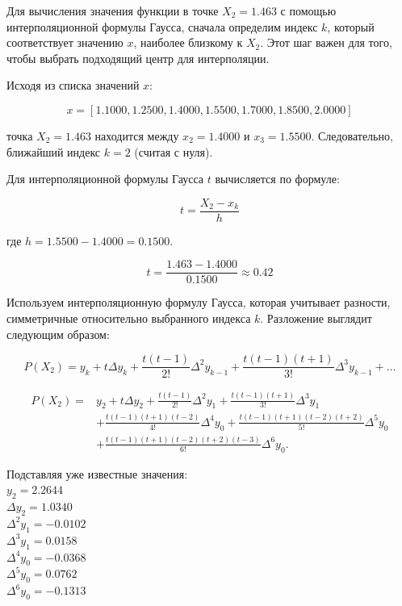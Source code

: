 \documentclass{article}
\begin{document}
                  Для вычисления значения функции в точке \( X_2 = 1.463 \) с помощью интерполяционной формулы Гаусса, сначала определим индекс \( k \), который соответствует значению \( x \), наиболее близкому к \( X_2 \). Этот шаг важен для того, чтобы выбрать подходящий центр для интерполяции.

                  Исходя из списка значений \( x \):

                  \[
                  x = [1.1000, 1.2500, 1.4000, 1.5500, 1.7000, 1.8500, 2.0000]
                  \]

                  точка \( X_2 = 1.463 \) находится между \( x_2 = 1.4000 \) и \( x_3 = 1.5500 \). Следовательно, ближайший индекс \( k = 2 \) (считая с нуля).

                  Для интерполяционной формулы Гаусса \( t \) вычисляется по формуле:

                  \[
                  t = \frac{X_2 - x_k}{h}
                  \]

                  где \( h = 1.5500 - 1.4000 = 0.1500 \).

                  \[
                  t = \frac{1.463 - 1.4000}{0.1500} \approx 0.42
                  \]

                  Используем интерполяционную формулу Гаусса, которая учитывает разности, симметричные относительно выбранного индекса \( k \). Разложение выглядит следующим образом:

                  \[
                  P(X_2) = y_k + t \Delta y_k + \frac{t(t-1)}{2!} \Delta^2 y_{k-1} + \frac{t(t-1)(t+1)}{3!} \Delta^3 y_{k-1} + \ldots
                  \]


                  \[
                  \begin{aligned}
                  P(X_2) = & y_2 + t \Delta y_2 + \frac{t(t-1)}{2!} \Delta^2 y_1 + \frac{t(t-1)(t+1)}{3!} \Delta^3 y_1 \\
                        & + \frac{t(t-1)(t+1)(t-2)}{4!} \Delta^4 y_0 + \frac{t(t-1)(t+1)(t-2)(t+2)}{5!} \Delta^5 y_0 \\
                        & + \frac{t(t-1)(t+1)(t-2)(t+2)(t-3)}{6!} \Delta^6 y_0.
                  \end{aligned}
                  \]

                  Подставляя уже известные значения:
                  \\
                  \( y_2 = 2.2644 \) \\
                  \( \Delta y_2 = 1.0340 \) \\
                  \( \Delta^2 y_1 = -0.0102 \) \\
                  \( \Delta^3 y_1 = 0.0158 \) \\
                  \( \Delta^4 y_0 = -0.0368 \) \\
                  \( \Delta^5 y_0 = 0.0762 \) \\
                  \( \Delta^6 y_0 = -0.1313 \) \\
\end{document}
